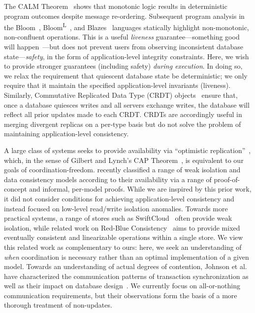  The CALM
Theorem~\cite{ameloot-calm} shows that monotonic logic results in
deterministic program outcomes despite message re-ordering. Subsequent
program analysis in the Bloom~\cite{calm},
Bloom\textsuperscript{L}~\cite{blooml}, and Blazes~\cite{blazes}
languages statically highlight non-monotonic, non-confluent
operations. This is a useful \textit{liveness} guarantee---something
good will happen~\cite{lamport-safety}---but does not prevent users
from observing inconsistent database state---\textit{safety}, in the
form of application-level integrity constraints.  Here, we wish to
provide stronger guarantees (including safety) \textit{during
  execution}. In doing so, we relax the requirement that quiescent
database state be deterministic; we only require that it maintain the
specified application-level invariants (liveness). Similarly,
Commutative Replicated Data Type (CRDT) objects~\cite{crdt} ensure
that, once a database quiesces writes and all servers exchange writes,
the database will reflect all prior updates made to each CRDT. CRDTs
are accordingly useful in merging divergent replicas on a per-type
basis but do not solve the problem of maintaining application-level
consistency.

 A large class of systems
seeks to provide availability via ``optimistic
replication''~\cite{optimistic}, which, in the sense of Gilbert and
Lynch's CAP Theorem~\cite{gilbert-cap}, is equivalent to our goals of
coordination-freedom. \cite{hat-vldb} recently classified a range of
weak isolation and data consistency models according to their
availability via a range of proof-of-concept and informal, per-model
proofs. While we are inspired by this prior work, it did not consider
conditions for achieving application-level consistency and instead
focused on low-level read/write isolation anomalies. Towards more
practical systems, a range of stores such as SwiftCloud~\cite{swift}
often provide weak isolation, while related work on Red-Blue
Consistency~\cite{redblue} aims to provide mixed eventually consistent
and linearizable operations within a single store. We view this
related work as complementary to ours: here, we seek an understanding
of \textit{when} coordination is necessary rather than an optimal
implementation of a given model. Towards an understanding of actual
degrees of contention, Johnson et al. have characterized the
communication patterns of transaction synchronization as well as their
impact on database design~\cite{shore-communication}. We currently
focus on all-or-nothing communication requirements, but their
observations form the basis of a more thorough treatment of
non-\iconfluent updates.


